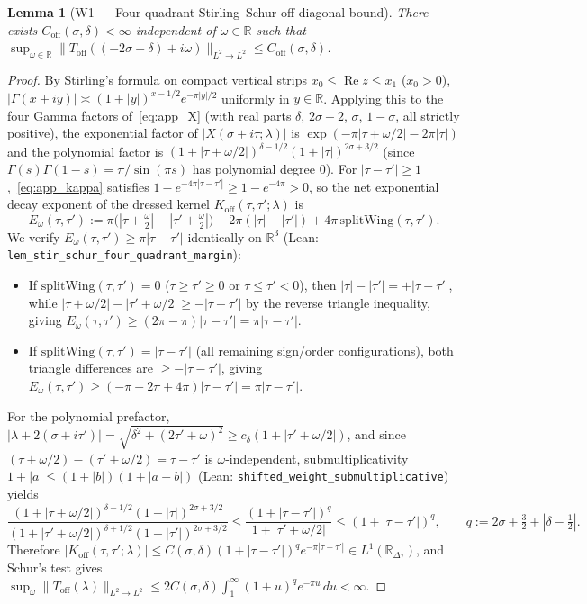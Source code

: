 \documentclass[11pt,a4paper]{article}
\newtheorem{lem}{Lemma}[section]
\begin{document}
\begin{lem}[W1 --- Four-quadrant Stirling--Schur off-diagonal bound]\label{lem:app_stir_schur}
There exists $C_{\mathrm{off}}(\sigma,\delta)<\infty$ independent of $\omega\in\mathbb{R}$ such that
$\sup_{\omega\in\mathbb{R}}\|T_{\mathrm{off}}((-2\sigma+\delta)+i\omega)\|_{L^2\to L^2}\le C_{\mathrm{off}}(\sigma,\delta)$.
\end{lem}
\begin{proof}
By Stirling's formula on compact vertical strips $x_0\le\operatorname{Re}z\le x_1$ ($x_0>0$),
$|\Gamma(x+iy)|\asymp (1+|y|)^{x-1/2}e^{-\pi|y|/2}$ uniformly in $y\in\mathbb{R}$.
Applying this to the four Gamma factors of~\eqref{eq:app_X} (with real parts
$\delta$, $2\sigma+2$, $\sigma$, $1-\sigma$, all strictly positive), the exponential factor of
$|X(\sigma+i\tau;\lambda)|$ is $\exp(-\pi|\tau+\omega/2|-2\pi|\tau|)$ and the polynomial factor is
$(1+|\tau+\omega/2|)^{\delta-1/2}(1+|\tau|)^{2\sigma+3/2}$ (since $\Gamma(s)\Gamma(1-s)=\pi/\sin(\pi s)$
has polynomial degree $0$).
For $|\tau-\tau'|\ge 1$,~\eqref{eq:app_kappa} satisfies $1-e^{-4\pi|\tau-\tau'|}\ge 1-e^{-4\pi}>0$,
so the net exponential decay exponent of the dressed kernel $K_{\mathrm{off}}(\tau,\tau';\lambda)$ is
\[
E_\omega(\tau,\tau') := \pi\bigl(|\tau+\tfrac{\omega}{2}|-|\tau'+\tfrac{\omega}{2}|\bigr) + 2\pi(|\tau|-|\tau'|) + 4\pi\,\mathrm{splitWing}(\tau,\tau').
\]
We verify $E_\omega(\tau,\tau')\ge\pi|\tau-\tau'|$ identically on $\mathbb{R}^3$
(Lean: \texttt{lem\_stir\_schur\_four\_quadrant\_margin}):
\begin{itemize}\setlength\itemsep{1pt}
\item If $\mathrm{splitWing}(\tau,\tau')=0$ ($\tau\ge\tau'\ge 0$ or $\tau\le\tau'<0$), then $|\tau|-|\tau'|=+|\tau-\tau'|$,
  while $|\tau+\omega/2|-|\tau'+\omega/2|\ge -|\tau-\tau'|$ by the reverse triangle inequality, giving
  $E_\omega(\tau,\tau')\ge (2\pi-\pi)|\tau-\tau'|=\pi|\tau-\tau'|$.
\item If $\mathrm{splitWing}(\tau,\tau')=|\tau-\tau'|$ (all remaining sign/order configurations), both triangle
  differences are $\ge -|\tau-\tau'|$, giving $E_\omega(\tau,\tau')\ge (-\pi-2\pi+4\pi)|\tau-\tau'|=\pi|\tau-\tau'|$.
\end{itemize}
For the polynomial prefactor, $|\lambda+2(\sigma+i\tau')|=\sqrt{\delta^2+(2\tau'+\omega)^2}\ge c_\delta(1+|\tau'+\omega/2|)$,
and since $(\tau+\omega/2)-(\tau'+\omega/2)=\tau-\tau'$ is $\omega$-independent, submultiplicativity
$1+|a|\le (1+|b|)(1+|a-b|)$ (Lean: \texttt{shifted\_weight\_submultiplicative}) yields
\[
\frac{(1+|\tau+\omega/2|)^{\delta-1/2}(1+|\tau|)^{2\sigma+3/2}}{(1+|\tau'+\omega/2|)^{\delta+1/2}(1+|\tau'|)^{2\sigma+3/2}}
\le \frac{(1+|\tau-\tau'|)^{q}}{1+|\tau'+\omega/2|} \le (1+|\tau-\tau'|)^q,
\qquad q := 2\sigma+\tfrac32+|\delta-\tfrac12|.
\]
Therefore $|K_{\mathrm{off}}(\tau,\tau';\lambda)|\le C(\sigma,\delta)(1+|\tau-\tau'|)^q e^{-\pi|\tau-\tau'|}\in L^1(\mathbb{R}_{\Delta\tau})$,
and Schur's test gives $\sup_{\omega}\|T_{\mathrm{off}}(\lambda)\|_{L^2\to L^2}\le 2C(\sigma,\delta)\int_1^\infty(1+u)^q e^{-\pi u}\,du<\infty$.
\end{proof}
\end{document}
